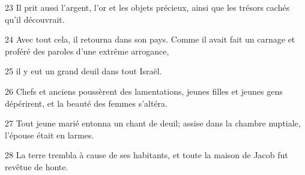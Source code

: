 
23 Il prit aussi l’argent, l’or et les objets précieux, ainsi que les trésors cachés qu’il découvrait.

24 Avec tout cela, il retourna dans son pays. Comme il avait fait un carnage et proféré des paroles d’une extrême arrogance,

25 il y eut un grand deuil dans tout Israël.

26 Chefs et anciens poussèrent des lamentations, jeunes filles et jeunes gens dépérirent, et la beauté des femmes s’altéra.

27 Tout jeune marié entonna un chant de deuil; assise dans la chambre nuptiale, l’épouse était en larmes.

28 La terre trembla à cause de ses habitants, et toute la maison de Jacob fut revêtue de honte.
